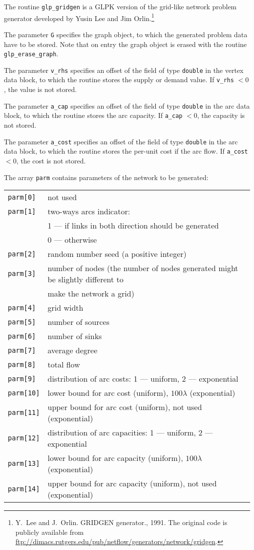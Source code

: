 \documentclass[11pt]{report}
\def\para#1{\noindent{\bf#1}}
\def\description{\para{Description}}
\begin{document}
\description

The routine \verb|glp_gridgen| is a GLPK version of the grid-like
network problem generator developed by Yusin Lee and Jim
Orlin.\footnote{Y.~Lee and J.~Orlin. GRIDGEN generator., 1991. The
original code is publicly available from
\url{ftp://dimacs.rutgers.edu/pub/netflow/generators/network/gridgen}.}

The parameter \verb|G| specifies the graph object, to which the
generated problem data have to be stored. Note that on entry the graph
object is erased with the routine \verb|glp_erase_graph|.

The parameter \verb|v_rhs| specifies an offset of the field of type
\verb|double| in the vertex data block, to which the routine stores the
supply or  demand value. If \verb|v_rhs| $<0$, the value is not stored.

The parameter \verb|a_cap| specifies an offset of the field of type
\verb|double| in the arc data block, to which the routine stores the
arc capacity. If \verb|a_cap| $<0$, the capacity is not stored.

The parameter \verb|a_cost| specifies an offset of the field of type
\verb|double| in the arc data block, to which the routine stores the
per-unit cost if the arc flow. If \verb|a_cost| $<0$, the cost is not
stored.

The array \verb|parm| contains parameters of the network to be
generated:

\begin{tabular}{@{}ll@{}}
\verb|parm[0] |&not used\\
\verb|parm[1] |&two-ways arcs indicator:\\
               &1 --- if links in both direction should be generated\\
               &0 --- otherwise\\
\verb|parm[2] |&random number seed (a positive integer)\\
\verb|parm[3] |&number of nodes (the number of nodes generated might
be slightly different to\\&make the network a grid)\\
\verb|parm[4] |&grid width\\
\verb|parm[5] |&number of sources\\
\verb|parm[6] |&number of sinks\\
\verb|parm[7] |&average degree\\
\verb|parm[8] |&total flow\\
\verb|parm[9] |&distribution of arc costs:
1 --- uniform, 2 --- exponential\\
\verb|parm[10]|&lower bound for arc cost (uniform),
$100\lambda$ (exponential)\\
\verb|parm[11]|&upper bound for arc cost (uniform),
not used (exponential)\\
\verb|parm[12]|&distribution of arc capacities:
1 --- uniform, 2 --- exponential\\
\verb|parm[13]|&lower bound for arc capacity (uniform),
$100\lambda$ (exponential)\\
\verb|parm[14]|&upper bound for arc capacity (uniform),
not used (exponential)\\
\end{tabular}
\end{document}
